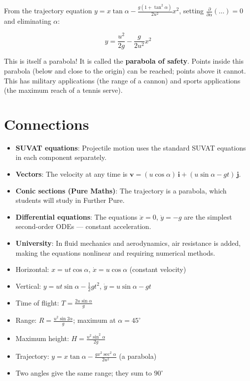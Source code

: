\documentclass[12pt, a4paper]{book}
\newcommand{\ii}{\mathbf{i}}
\newcommand{\jj}{\mathbf{j}}
\newcommand{\vvec}{\mathbf{v}}
\begin{document}
\begin{explorationbox}
From the trajectory equation $y = x\tan\alpha - \frac{g(1+\tan^2\alpha)}{2u^2}x^2$, setting $\frac{\partial}{\partial\alpha}(\ldots) = 0$ and eliminating $\alpha$:

\[
  y = \frac{u^2}{2g} - \frac{g}{2u^2}x^2
\]

This is itself a parabola! It is called the \textbf{parabola of safety}. Points inside this parabola (below and close to the origin) can be reached; points above it cannot. This has military applications (the range of a cannon) and sports applications (the maximum reach of a tennis serve).
\end{explorationbox}

\section{Connections}

\begin{itemize}[leftmargin=2em]
  \item \textbf{SUVAT equations}: Projectile motion uses the standard SUVAT equations in each component separately.
  \item \textbf{Vectors}: The velocity at any time is $\vvec = (u\cos\alpha)\,\ii + (u\sin\alpha - gt)\,\jj$.
  \item \textbf{Conic sections (Pure Maths)}: The trajectory is a parabola, which students will study in Further Pure.
  \item \textbf{Differential equations}: The equations $\ddot{x} = 0$, $\ddot{y} = -g$ are the simplest second-order ODEs --- constant acceleration.
  \item \textbf{University}: In fluid mechanics and aerodynamics, air resistance is added, making the equations nonlinear and requiring numerical methods.
\end{itemize}

\begin{summarybox}
\begin{itemize}[leftmargin=1.5em]
  \item Horizontal: $x = ut\cos\alpha$, $\dot{x} = u\cos\alpha$ (constant velocity)
  \item Vertical: $y = ut\sin\alpha - \frac{1}{2}gt^2$, $\dot{y} = u\sin\alpha - gt$
  \item Time of flight: $T = \frac{2u\sin\alpha}{g}$
  \item Range: $R = \frac{u^2\sin 2\alpha}{g}$; maximum at $\alpha = 45^\circ$
  \item Maximum height: $H = \frac{u^2\sin^2\alpha}{2g}$
  \item Trajectory: $y = x\tan\alpha - \frac{gx^2\sec^2\alpha}{2u^2}$ (a parabola)
  \item Two angles give the same range; they sum to $90^\circ$
\end{itemize}
\end{summarybox}
\end{document}
